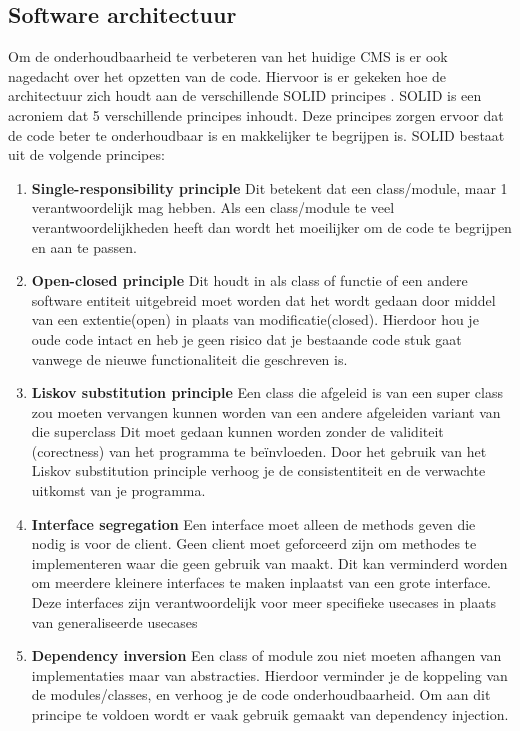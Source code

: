 \subsection{Software architectuur}
\label{subsecion:SoftwareArhitectuur}
Om de onderhoudbaarheid te verbeteren van het huidige CMS is er ook nagedacht over het opzetten van de code.
Hiervoor is er gekeken hoe de architectuur zich houdt aan de verschillende SOLID principes \parencite{SOLID}. 
SOLID is een acroniem dat 5 verschillende principes inhoudt.
Deze principes zorgen ervoor dat de code beter te onderhoudbaar is en makkelijker te begrijpen is.
SOLID bestaat uit de volgende principes:

\begin{enumerate}
    \item \textbf{Single-responsibility principle}
    Dit betekent dat een class\slash module, maar 1 verantwoordelijk mag hebben.
    Als een class\slash module te veel verantwoordelijkheden heeft dan wordt het moeilijker om de code te begrijpen en aan te passen.

    \item \textbf{Open-closed principle}
    Dit houdt in als class of functie of een andere software entiteit uitgebreid moet worden dat het wordt gedaan door middel van een extentie(open) in plaats van modificatie(closed).
    Hierdoor hou je oude code intact en heb je geen risico dat je bestaande code stuk gaat vanwege de nieuwe functionaliteit die geschreven is. 
        
    \item \textbf{Liskov substitution principle}
    Een class die afgeleid is van een super class zou moeten vervangen kunnen worden van een andere afgeleiden variant van die superclass
    Dit moet gedaan kunnen worden zonder de validiteit (corectness) van het programma te beïnvloeden.
    Door het gebruik van het Liskov substitution principle verhoog je de consistentiteit en de verwachte uitkomst van je programma.

    \item \textbf{Interface segregation} 
    Een interface moet alleen de methods geven die nodig is voor de client. 
    Geen client moet geforceerd zijn om methodes te implementeren waar die geen gebruik van maakt.
    Dit kan verminderd worden om meerdere kleinere interfaces te maken inplaatst van een grote interface.
    Deze interfaces zijn verantwoordelijk voor meer specifieke usecases in plaats van generaliseerde usecases

    \item \textbf{Dependency inversion} 
    Een class of module zou niet moeten afhangen van implementaties maar van abstracties.
    Hierdoor verminder je de koppeling van de modules/classes, en verhoog je de code onderhoudbaarheid.
    Om aan dit principe te voldoen wordt er vaak gebruik gemaakt van dependency injection.
\end{enumerate}

